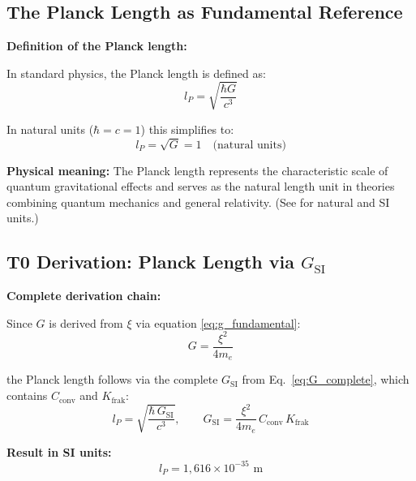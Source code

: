 	\subsection{The Planck Length as Fundamental Reference}
	
	\begin{derivation}
		\textbf{Definition of the Planck length:}
		
		In standard physics, the Planck length is defined as:
		\begin{equation}
			l_P = \sqrt{\frac{\hbar G}{c^3}}
			\label{eq:planck_length_standard}
		\end{equation}
		
		In natural units ($\hbar = c = 1$) this simplifies to:
		\begin{equation}
			\boxed{l_P = \sqrt{G} = 1 \quad \text{(natural units)}}
			\label{eq:planck_natural}
		\end{equation}
		
		\textbf{Physical meaning:} The Planck length represents the characteristic scale of quantum gravitational effects and serves as the natural length unit in theories combining quantum mechanics and general relativity. (See \cite{T0_natural_SI_En} for natural and SI units.)
	\end{derivation}
	
	\subsection{T0 Derivation: Planck Length via $G_{\text{SI}}$}
	
	\begin{keyresult}
		\textbf{Complete derivation chain:}
		
		Since $G$ is derived from $\xi$ via equation \eqref{eq:g_fundamental}:
		\begin{equation}
			G = \frac{\xi^2}{4 m_e}
		\end{equation}
		
		the Planck length follows via the complete $G_{\text{SI}}$ from Eq.~\eqref{eq:G_complete}, which contains $C_{\text{conv}}$ and $K_{\text{frak}}$:
		\begin{equation}
			l_P = \sqrt{\frac{\hbar\,G_{\text{SI}}}{c^3}}, \qquad G_{\text{SI}} = \frac{\xi^2}{4 m_e}\,C_{\text{conv}}\,K_{\text{frak}}
		\end{equation}

		\textbf{Result in SI units:}
		\begin{equation}
			\boxed{l_P = 1{,}616 \times 10^{-35} \text{ m}}
		\end{equation}

	\end{keyresult}
	
